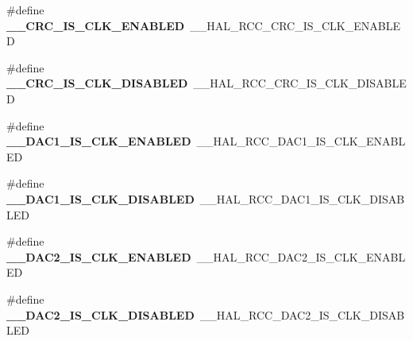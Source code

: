\begin{DoxyCompactItemize}
\item 
\#define {\bfseries \+\_\+\+\_\+\+C\+R\+C\+\_\+\+I\+S\+\_\+\+C\+L\+K\+\_\+\+E\+N\+A\+B\+L\+ED}~\+\_\+\+\_\+\+H\+A\+L\+\_\+\+R\+C\+C\+\_\+\+C\+R\+C\+\_\+\+I\+S\+\_\+\+C\+L\+K\+\_\+\+E\+N\+A\+B\+L\+ED\hypertarget{group___h_a_l___r_c_c___aliased_ga134978ca782086807d3340e1d9bc5c70}{}\label{group___h_a_l___r_c_c___aliased_ga134978ca782086807d3340e1d9bc5c70}

\item 
\#define {\bfseries \+\_\+\+\_\+\+C\+R\+C\+\_\+\+I\+S\+\_\+\+C\+L\+K\+\_\+\+D\+I\+S\+A\+B\+L\+ED}~\+\_\+\+\_\+\+H\+A\+L\+\_\+\+R\+C\+C\+\_\+\+C\+R\+C\+\_\+\+I\+S\+\_\+\+C\+L\+K\+\_\+\+D\+I\+S\+A\+B\+L\+ED\hypertarget{group___h_a_l___r_c_c___aliased_ga8fc4c0275c6936b2f636c3bb4dc48385}{}\label{group___h_a_l___r_c_c___aliased_ga8fc4c0275c6936b2f636c3bb4dc48385}

\item 
\#define {\bfseries \+\_\+\+\_\+\+D\+A\+C1\+\_\+\+I\+S\+\_\+\+C\+L\+K\+\_\+\+E\+N\+A\+B\+L\+ED}~\+\_\+\+\_\+\+H\+A\+L\+\_\+\+R\+C\+C\+\_\+\+D\+A\+C1\+\_\+\+I\+S\+\_\+\+C\+L\+K\+\_\+\+E\+N\+A\+B\+L\+ED\hypertarget{group___h_a_l___r_c_c___aliased_ga167f94eac0b5ff0a51306a69365c4956}{}\label{group___h_a_l___r_c_c___aliased_ga167f94eac0b5ff0a51306a69365c4956}

\item 
\#define {\bfseries \+\_\+\+\_\+\+D\+A\+C1\+\_\+\+I\+S\+\_\+\+C\+L\+K\+\_\+\+D\+I\+S\+A\+B\+L\+ED}~\+\_\+\+\_\+\+H\+A\+L\+\_\+\+R\+C\+C\+\_\+\+D\+A\+C1\+\_\+\+I\+S\+\_\+\+C\+L\+K\+\_\+\+D\+I\+S\+A\+B\+L\+ED\hypertarget{group___h_a_l___r_c_c___aliased_ga1f690182f7520375d42f4ea913191af7}{}\label{group___h_a_l___r_c_c___aliased_ga1f690182f7520375d42f4ea913191af7}

\item 
\#define {\bfseries \+\_\+\+\_\+\+D\+A\+C2\+\_\+\+I\+S\+\_\+\+C\+L\+K\+\_\+\+E\+N\+A\+B\+L\+ED}~\+\_\+\+\_\+\+H\+A\+L\+\_\+\+R\+C\+C\+\_\+\+D\+A\+C2\+\_\+\+I\+S\+\_\+\+C\+L\+K\+\_\+\+E\+N\+A\+B\+L\+ED\hypertarget{group___h_a_l___r_c_c___aliased_gad47e165f1cc2ccd6296e01c01cbf34f6}{}\label{group___h_a_l___r_c_c___aliased_gad47e165f1cc2ccd6296e01c01cbf34f6}

\item 
\#define {\bfseries \+\_\+\+\_\+\+D\+A\+C2\+\_\+\+I\+S\+\_\+\+C\+L\+K\+\_\+\+D\+I\+S\+A\+B\+L\+ED}~\+\_\+\+\_\+\+H\+A\+L\+\_\+\+R\+C\+C\+\_\+\+D\+A\+C2\+\_\+\+I\+S\+\_\+\+C\+L\+K\+\_\+\+D\+I\+S\+A\+B\+L\+ED\hypertarget{group___h_a_l___r_c_c___aliased_ga2701288e709e6bc30d7bc10732e7f854}{}\label{group___h_a_l___r_c_c___aliased_ga2701288e709e6bc30d7bc10732e7f854}


\end{DoxyCompactItemize}
